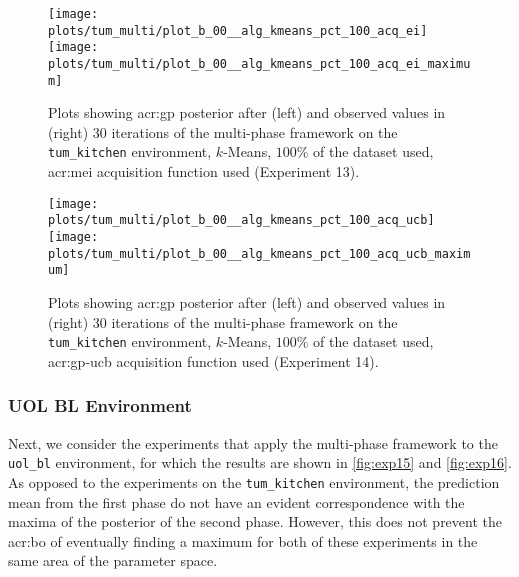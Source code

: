 \begin{figure}[t!]
	\centering
	\texttt{[image: plots/tum\_multi/plot\_b\_00\_\_alg\_kmeans\_pct\_100\_acq\_ei]}
	\texttt{[image: plots/tum\_multi/plot\_b\_00\_\_alg\_kmeans\_pct\_100\_acq\_ei\_maximum]}
	\caption{Plots showing \acrshort{acr:gp} posterior after (left) and observed values in (right) 30 iterations of the multi-phase framework on the \texttt{tum\_kitchen} environment, $k$-Means, $100\%$ of the dataset used, \acrshort{acr:mei} acquisition function used (Experiment 13).}
	\label{fig:exp13}
\end{figure}
\begin{figure}[t!]
	\centering
	\texttt{[image: plots/tum\_multi/plot\_b\_00\_\_alg\_kmeans\_pct\_100\_acq\_ucb]}
	\texttt{[image: plots/tum\_multi/plot\_b\_00\_\_alg\_kmeans\_pct\_100\_acq\_ucb\_maximum]}
	\caption{Plots showing \acrshort{acr:gp} posterior after (left) and observed values in (right) 30 iterations of the multi-phase framework on the \texttt{tum\_kitchen} environment, $k$-Means, $100\%$ of the dataset used, \acrshort{acr:gp-ucb} acquisition function used (Experiment 14).}
	\label{fig:exp14}
\end{figure}%

\newpage

\subsubsection{UOL BL Environment}
Next, we consider the experiments that apply the multi-phase framework to the \texttt{uol\_bl} environment, for which the results are shown in \autoref{fig:exp15} and \autoref{fig:exp16}.
As opposed to the experiments on the \texttt{tum\_kitchen} environment, the prediction mean from the first phase do not have an evident correspondence with the maxima of the posterior of the second phase.
However, this does not prevent the \acrshort{acr:bo} of eventually finding a maximum for both of these experiments in the same area of the parameter space.

